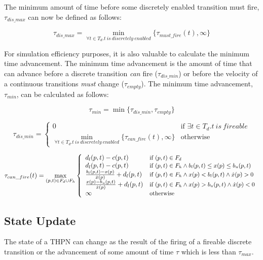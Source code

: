 \documentclass[11pt,times]{article}
\begin{document}
The minimum amount of time before some discretely enabled transition must fire,
$\tau_{dis\_max}$ can now be defined as follows:

\[ \tau_{dis\_max}  =  \min_{\forall t \in T_d .
   \mathit{t\ is\ discretely\ enabled}}
 \{\tau_{must\_fire}(t), \infty\}\]

For simulation efficiency purposes, it is also valuable to calculate the
minimum time advancement.  The minimum time advancement is the amount
of time that can advance before a discrete transition \emph{can}
fire ($\tau_{dis\_min}$) or before the velocity of a continuous
transitions \emph{must} change ($\tau_{empty}$).  The
minimum time advancement, $\tau_{min}$, can be calculated as follows:

\[ \tau_{min} = \min \{ \tau_{dis\_min}, \tau_{empty} \}\]

\[ \tau_{dis\_min}  =  \left\{ \begin{array}{ll}
  0 & \mbox{if $\exists t \in T_d . t \mathit{\ is\ fireable}$} \\
  \min_{\forall t \in T_d . \mathit{t\ is\ discretely\ enabled}}
  \{\tau_{can\_fire}(t), \infty\} & \mbox{otherwise}
  \end{array} \right.
\]

\[\tau_{can\_fire}(t) = \max_{(p, t) \in F_d \cup F_h} \left\{
    \begin{array}{ll}
      d_l(p, t) - c(p, t) & \mbox{\small if $(p, t) \in F_d$} \\
      d_l(p, t) - c(p, t) & \mbox{\small if $(p, t) \in F_h \wedge
      b_l(p, t) \leq x(p) \leq b_u(p, t)$} \\
      \frac{b_l(p, t)-x(p)}{\dot{x}(p)} + d_l(p, t) &
      \mbox{\small if $(p,t) \in F_h \wedge x(p) < b_l(p,t) \wedge \dot{x}(p)
      > 0$}\\
      \frac{x(p)-b_u(p,t)}{\dot{x}(p)} + d_l(p, t) &
      \mbox{\small if $(p,t) \in F_h \wedge x(p) > b_u(p,t) \wedge \dot{x}(p) <
      0$}\\
      \infty & \mbox{\small otherwise}
    \end{array}
    \right.\]


\subsection{State Update}

The state of a THPN can change as the result of the firing of a fireable
discrete transition or the advancement of some amount of time $\tau$ which
is less than $\tau_{max}$.  
\end{document}
